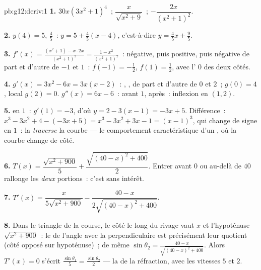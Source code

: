 \begin{solution}{pb:g12:deriv:1}
\textbf{1.} $30x\left(3x^2 + 1\right)^4$~; \quad
$\dfrac{x}{\sqrt{x^2 + 9}}$~; \quad
$-\dfrac{2x}{\left(x^2 + 1\right)^2}$.

\textbf{2.} $y(4) = 5$,  $\frac45$~:
 $y = 5 + \frac45(x - 4)$, c'est-à-dire
$y = \frac45 x + \frac95$.

\textbf{3.} $f'(x) = \frac{(x^2 + 1) - x \cdot 2x}{(x^2+1)^2}
= \frac{1 - x^2}{(x^2 + 1)^2}$~: négative, puis positive, puis
négative de part et d'autre de $-1$ et $1$~: 
$f(-1) = -\frac12$,  $f(1) = \frac12$, avec l' $0$ des deux côtés.

\textbf{4.} $g'(x) = 3x^2 - 6x = 3x(x - 2)$~: ,
,  de part et d'autre de $0$ et $2$~;  $g(0) = 4$,  local $g(2) = 0$. $g''(x) = 6x - 6$~:
 avant $1$,  après~: inflexion en $(1, 2)$.

\textbf{5.}  en $1$~: 
$g'(1) = -3$, d'où $y = 2 - 3(x - 1) = -3x + 5$. Différence~:
$x^3 - 3x^2 + 4 - (-3x + 5) = x^3 - 3x^2 + 3x - 1 = (x - 1)^3$,
qui change de signe en $1$~: la  \emph{traverse} la courbe
--- le comportement caractéristique d'un , où la
courbe change de côté.

\textbf{6.} $T(x) = \dfrac{\sqrt{x^2 + 900}}{5} +
\dfrac{\sqrt{(40 - x)^2 + 400}}{2}$. Entrer avant $0$ ou au-delà de
$40$ rallonge les \emph{deux} portions~: c'est sans intérêt.

\textbf{7.} $T'(x) = \dfrac{x}{5\sqrt{x^2 + 900}} -
\dfrac{40 - x}{2\sqrt{(40 - x)^2 + 400}}$.

\textbf{8.} Dans le triangle de la course, le côté le long du
rivage vaut $x$ et l'hypoténuse $\sqrt{x^2 + 900}$~: le  de
l'angle avec la perpendiculaire est précisément leur quotient (côté
opposé sur hypoténuse)~; de même
$\sin\theta_2 = \frac{40 - x}{\sqrt{(40-x)^2 + 400}}$. Alors
$T'(x) = 0$ s'écrit
$\frac{\sin\theta_1}{5} = \frac{\sin\theta_2}{2}$ --- la  de la
réfraction, avec les vitesses $5$ et $2$.


\end{solution}

